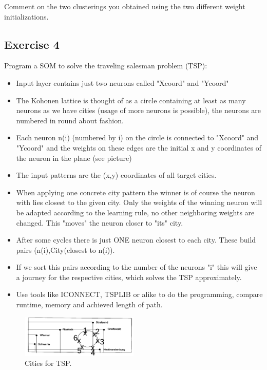\documentclass[a4paper, 12pt]{article}
\begin{document}
Comment on the two clusterings you obtained using the two different weight initializations.

\subsection{Exercise 4}
Program a SOM to solve the traveling salesman problem (TSP):
\begin{itemize}
\item  Input layer contains just two neurons called "Xcoord" and "Ycoord"
\item The Kohonen lattice is thought of as a circle containing at least as many neurons as we have cities (usage of more neurons is possible), the neurons are numbered in round about fashion.
\item Each neuron n(i) (numbered by i) on the circle is connected to "Xcoord" and "Ycoord" and the weights on these edges are the initial x and y coordinates of the neuron in the plane (see picture)
\item The input patterns are the (x,y) coordinates of all target cities.
\item When applying one concrete city pattern the winner is of course the neuron with lies closest to the given city. Only the weights of the winning neuron will be adapted according to the learning rule, no other neighboring weights are changed. This "moves" the neuron closer to "its" city.
\item After some cycles there is just ONE neuron closest to each city. These build pairs (n(i),City(closest to n(i)).
\item If we sort this pairs according to the number of the neurons "i" this will give a journey for the respective cities, which solves the TSP approximately.
\item Use tools like ICONNECT, TSPLIB or alike to do the programming, compare runtime, memory and achieved length of path.
\end{itemize}

\begin{figure}[h]
  \centering
  \caption{Cities for TSP.\label{cities}}
  \includegraphics[width=0.5\textwidth]{cities}
\end{figure}
\end{document}
